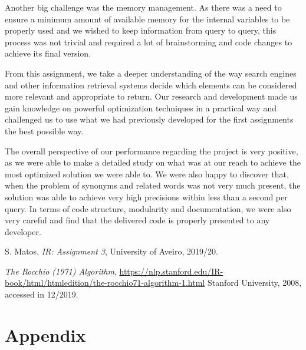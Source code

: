 \documentclass[12pt]{article}
\begin{document}
Another big challenge was the memory management.
As there was a need to ensure a minimum amount of available memory for the internal
variables to be properly used and we wished to keep information from query to query,
this process was not trivial and required a lot of brainstorming and code changes 
to achieve its final version.

From this assignment, we take a deeper understanding of the way search engines 
and other information retrieval systems decide which elements can be considered
more relevant and appropriate to return.
Our research and development made us gain knowledge on powerful optimization 
techniques in a practical way and challenged us to use what we had previously
developed for the first assignments the best possible way.

The overall perspective of our performance regarding the project is very positive,
as we were able to make a detailed study on what was at our reach to achieve the 
most optimized solution we were able to.
We were also happy to discover that, when the problem of synonyms and related 
words was not very much present, the solution was able to achieve very high 
precisions within less than a second per query.
In terms of code structure, modularity and documentation, we were also very 
careful and find that the delivered code is properly presented to any developer.

\begin{thebibliography}{9}
  

    S. Matos,
    \textit{IR: Assignment 3},
    University of Aveiro,
    2019/20.

    \textit{The Rocchio (1971) Algorithm},
    \url{https://nlp.stanford.edu/IR-book/html/htmledition/the-rocchio71-algorithm-1.html}
    Stanford University,
    2008,
    accessed in 12/2019.
  
\end{thebibliography}

\appendix
\section*{Appendix}
\end{document}
